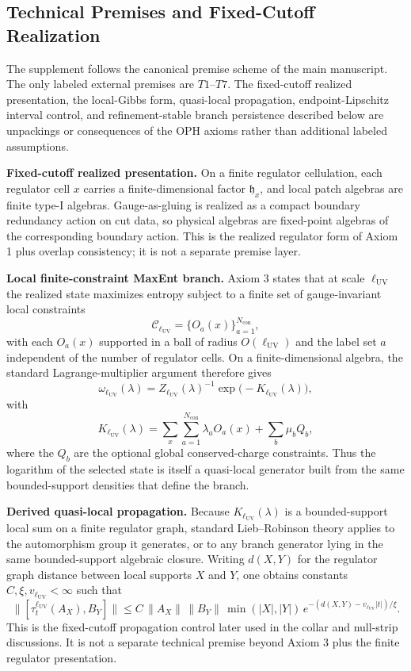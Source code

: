 \subsection{Technical Premises and Fixed-Cutoff Realization}\label{12-regulator-premises}

The supplement follows the canonical premise scheme of the main manuscript. The only labeled external premises are \(T1\)--\(T7\). The fixed-cutoff realized presentation, the local-Gibbs form, quasi-local propagation, endpoint-Lipschitz interval control, and refinement-stable branch persistence described below are unpackings or consequences of the OPH axioms rather than additional labeled assumptions.

\textbf{Fixed-cutoff realized presentation.} On a finite regulator cellulation, each regulator cell \(x\) carries a finite-dimensional factor \(\mathfrak h_x\), and local patch algebras are finite type-I algebras. Gauge-as-gluing is realized as a compact boundary redundancy action on cut data, so physical algebras are fixed-point algebras of the corresponding boundary action. This is the realized regulator form of Axiom 1 plus overlap consistency; it is not a separate premise layer.

\textbf{Local finite-constraint MaxEnt branch.} Axiom 3 states that at scale \(\ell_{\mathrm{UV}}\) the realized state maximizes entropy subject to a finite set of gauge-invariant local constraints
\[
\mathcal C_{\ell_{\mathrm{UV}}}=\{O_a(x)\}_{a=1}^{N_{\mathrm{con}}},
\]
with each \(O_a(x)\) supported in a ball of radius \(O(\ell_{\mathrm{UV}})\) and the label set \(a\) independent of the number of regulator cells. On a finite-dimensional algebra, the standard Lagrange-multiplier argument therefore gives
\[
\omega_{\ell_{\mathrm{UV}}}(\lambda)
=
Z_{\ell_{\mathrm{UV}}}(\lambda)^{-1}
\exp\!\bigl(-K_{\ell_{\mathrm{UV}}}(\lambda)\bigr),
\]
with
\[
K_{\ell_{\mathrm{UV}}}(\lambda)
=
\sum_x \sum_{a=1}^{N_{\mathrm{con}}}\lambda_a O_a(x)
+\sum_b \mu_b Q_b,
\]
where the \(Q_b\) are the optional global conserved-charge constraints. Thus the logarithm of the selected state is itself a quasi-local generator built from the same bounded-support densities that define the branch.

\textbf{Derived quasi-local propagation.} Because \(K_{\ell_{\mathrm{UV}}}(\lambda)\) is a bounded-support local sum on a finite regulator graph, standard Lieb--Robinson theory applies to the automorphism group it generates, or to any branch generator lying in the same bounded-support algebraic closure. Writing \(d(X,Y)\) for the regulator graph distance between local supports \(X\) and \(Y\), one obtains constants \(C,\xi,v_{\ell_{\mathrm{UV}}}<\infty\) such that
\[
\bigl\|[\tau_t^{\ell_{\mathrm{UV}}}(A_X),B_Y]\bigr\|
\le
C\,\|A_X\|\,\|B_Y\|\,\min(|X|,|Y|)\,
e^{-(d(X,Y)-v_{\ell_{\mathrm{UV}}}|t|)/\xi}.
\]
This is the fixed-cutoff propagation control later used in the collar and null-strip discussions. It is not a separate technical premise beyond Axiom 3 plus the finite regulator presentation.

